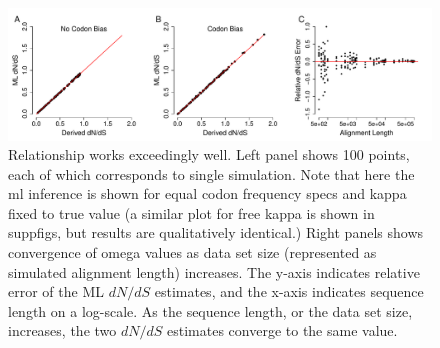 \documentclass[11pt]{article}
\begin{document}







\clearpage
\newpage

	

\clearpage
\newpage	

\begin{figure}[H]
\centerline{\includegraphics[width=6in]{figures/MainText/regression_convergence.pdf}}
\caption{\label{reg_conv} Relationship works exceedingly well. Left panel shows 100 points, each of which corresponds to single simulation. Note that here the ml inference is shown for equal codon frequency specs and kappa fixed to true value (a similar plot for free kappa is shown in suppfigs, but results are qualitatively identical.) Right panels shows convergence of omega values as data set size (represented as simulated alignment length) increases. The y-axis indicates relative error of the ML $dN/dS$ estimates, and the x-axis indicates sequence length on a log-scale. As the sequence length, or the data set size, increases, the two $dN/dS$ estimates converge to the same value. }
\end{figure}
\end{document}
